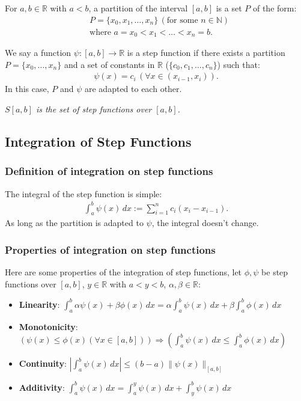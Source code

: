 \documentclass[a4paper, 12pt, twoside]{article}
\begin{document}
For $a, b \in \mathbb{R}$ with $a < b$, a partition of the interval
$[a,b]$ is a set $P$ of the form:
\begin{align*}
       & P = \{x_0, x_1, \ldots, x_n\} \, (\text{for some } n \in \mathbb{N}) \\
       & \text{where } a = x_0 < x_1 < \ldots < x_n = b.
\end{align*}

We say a function $\psi:[a,b]\to\mathbb{R}$ is a step function if
there exists a partition $P = \{x_0, \ldots, x_n\}$ and a set of constants in
$\mathbb{R}$ ($\{c_0, c_1, \ldots, c_n\}$) such that:
\begin{align*}
      \psi(x) = c_i \, (\forall x \in (x_{i-1}, x_i)).
\end{align*}
In this case, $P$ and $\psi$ are adapted to each other.

\vspace{\baselineskip}

\textit{$S[a, b]$ is the set of step functions over $[a, b]$.}

\subsection{Integration of Step Functions}

\subsubsection{Definition of integration on step functions}

The integral of the step function is simple:
\begin{align*}
      \int_a^b \psi(x) \, dx := \sum_{i = 1}^n c_i(x_i - x_{i-1}).
\end{align*}
As long as the partition is adapted to $\psi$, the integral doesn't
change.

\subsubsection{Properties of integration on step functions}

Here are some properties of the integration of step functions, let
$\phi, \psi$ be step functions over $[a, b]$, $y \in \mathbb{R}$
with $a < y < b$, $\alpha, \beta \in \mathbb{R}$:

\begin{itemize}
      \item \textbf{Linearity}: $\int_a^b \alpha \psi(x) + \beta \phi(x)
                  \, dx = \alpha \int_a^b \psi(x) \, dx + \beta \int_a^b
                  \phi(x) \, dx$
      \item \textbf{Monotonicity}: $(\psi(x) \leq \phi(x) (\forall
                  x \in [a, b])) \Rightarrow (\int_a^b \psi(x) \, dx
                  \leq \int_a^b \phi(x) \, dx)$
      \item \textbf{Continuity}: $|\int_a^b \psi(x) \, dx| \leq (b-a)
                  \|\psi(x)\|_{[a, b]}$
      \item \textbf{Additivity}: $\int_a^b \psi(x) \, dx = \int_a^y
                  \psi(x) \, dx + \int_y^b \psi(x) \, dx$
\end{itemize}
\end{document}
